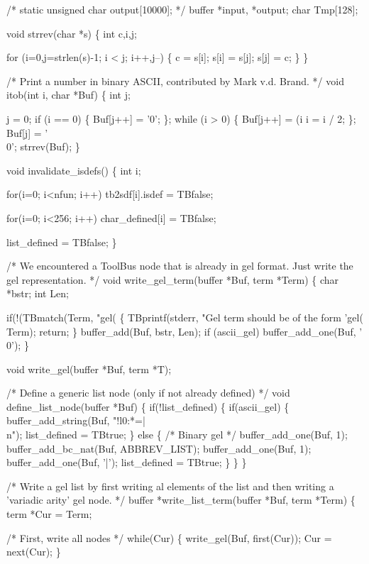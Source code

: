 /*
static unsigned char output[10000];
*/
buffer *input, *output;
char Tmp[128];

void strrev(char *s)
\{
  int c,i,j;

  for (i=0,j=strlen(s)-1; i < j; i++,j--)
    \{
      c = s[i];
      s[i] = s[j];
      s[j] = c;
    \}
\}

/* Print a number in binary ASCII, contributed
   by Mark v.d. Brand.
*/
void itob(int i, char *Buf)
\{
  int j;

  j = 0;
  if (i == 0) \{
    Buf[j++] = '0';
  \};
  while (i > 0) \{
    Buf[j++] = (i%
    i = i / 2;
  \};
  Buf[j] = '\\0';
  strrev(Buf);
\}

void invalidate_isdefs()
\{
  int i;

  for(i=0; i<nfun; i++)
    tb2sdf[i].isdef = TBfalse;

  for(i=0; i<256; i++)
    char_defined[i] = TBfalse;

  list_defined = TBfalse;
\}

/* We encountered a ToolBus node that is already in
   gel format. Just write the gel representation. */
void write_gel_term(buffer *Buf, term *Term)
\{
  char *bstr;
  int Len;

  if(!(TBmatch(Term, "gel(%
    \{
      TBprintf(stderr, "Gel term should be of the form 'gel(%
               Term);
      return;
    \}
  buffer_add(Buf, bstr, Len);
  if (ascii_gel)
    buffer_add_one(Buf, '\\0');
\}

void write_gel(buffer *Buf, term *T);

/* Define a generic list node (only if not already defined) */
void define_list_node(buffer *Buf)
\{
  if(!list_defined)
    \{
      if(ascii_gel)
        \{
          buffer_add_string(Buf, "!l0:*=|\\n");
          list_defined = TBtrue;
        \}
      else
        \{
          /* Binary gel */
          buffer_add_one(Buf, 1);
          buffer_add_bc_nat(Buf, ABBREV_LIST);
          buffer_add_one(Buf, 1);
          buffer_add_one(Buf, '|');
          list_defined = TBtrue;
        \}
    \}
\}

/* Write a gel list by first writing al elements of
   the list and then writing a 'variadic arity' gel node. */
buffer *write_list_term(buffer *Buf, term *Term)
\{
  term *Cur = Term;

  /* First, write all nodes */
  while(Cur)
    \{
      write_gel(Buf, first(Cur));
      Cur = next(Cur);
    \}

